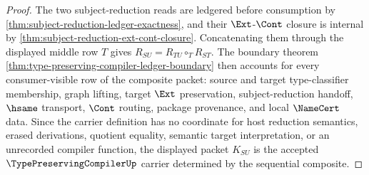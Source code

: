 \begin{proof}
The two subject-reduction reads are ledgered before consumption by \autoref{thm:subject-reduction-ledger-exactness}, and their $\Ext$-$\Cont$ closure is internal by \autoref{thm:subject-reduction-ext-cont-closure}. Concatenating them through the displayed middle row $T$ gives $R_{SU}=R_{TU}\circ_T R_{ST}$. The boundary theorem \autoref{thm:type-preserving-compiler-ledger-boundary} then accounts for every consumer-visible row of the composite packet: source and target type-classifier membership, graph lifting, target $\Ext$ preservation, subject-reduction handoff, $\hsame$ transport, $\Cont$ routing, package provenance, and local $\NameCert$ data. Since the carrier definition has no coordinate for host reduction semantics, erased derivations, quotient equality, semantic target interpretation, or an unrecorded compiler function, the displayed packet $K_{SU}$ is the accepted $\TypePreservingCompilerUp$ carrier determined by the sequential composite.
\end{proof}

